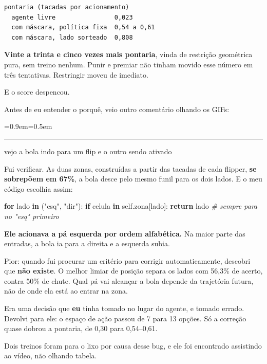 \documentclass[10pt,a4paper,twoside,twocolumn]{scrartcl}
\newenvironment{Shaded}{}{}
\newcommand{\CommentTok}[1]{\textcolor[rgb]{0.38,0.63,0.69}{\textit{#1}}}
\newcommand{\ControlFlowTok}[1]{\textcolor[rgb]{0.00,0.44,0.13}{\textbf{#1}}}
\newcommand{\KeywordTok}[1]{\textcolor[rgb]{0.00,0.44,0.13}{\textbf{#1}}}
\newcommand{\NormalTok}[1]{#1}
\newcommand{\StringTok}[1]{\textcolor[rgb]{0.25,0.44,0.63}{#1}}
\newcommand{\VariableTok}[1]{\textcolor[rgb]{0.10,0.09,0.49}{#1}}
\renewenvironment{quote}
  {\begin{list}{}{\leftmargin=0.9em\rightmargin=0pt\topsep=0.5em}\item[]%
   \color{destaque}\itshape\small
   \hspace*{-0.9em}\rule[-0.4em]{1.2pt}{1.1em}\hspace{0.5em}\ignorespaces}
  {\end{list}}
\begin{document}
\begin{verbatim}
pontaria (tacadas por acionamento)
  agente livre                0,023
  com máscara, política fixa  0,54 a 0,61
  com máscara, lado sorteado  0,808
\end{verbatim}

\textbf{Vinte a trinta e cinco vezes mais pontaria}, vinda de restrição
geométrica pura, sem treino nenhum. Punir e premiar não tinham movido
esse número em três tentativas. Restringir moveu de imediato.

E o score despencou.

Antes de eu entender o porquê, veio outro comentário olhando os GIFs:

\begin{quote}
vejo a bola indo para um flip e o outro sendo ativado
\end{quote}

Fui verificar. As duas zonas, construídas a partir das tacadas de cada
flipper, \textbf{se sobrepõem em 67\%}, a bola desce pelo mesmo funil
para os dois lados. E o meu código escolhia assim:

\begin{Shaded}
\begin{Highlighting}[]
\ControlFlowTok{for}\NormalTok{ lado }\KeywordTok{in}\NormalTok{ (}\StringTok{"esq"}\NormalTok{, }\StringTok{"dir"}\NormalTok{):}
    \ControlFlowTok{if}\NormalTok{ celula }\KeywordTok{in} \VariableTok{self}\NormalTok{.zona[lado]:}
        \ControlFlowTok{return}\NormalTok{ lado          }\CommentTok{\# sempre para no "esq" primeiro}
\end{Highlighting}
\end{Shaded}

\textbf{Ele acionava a pá esquerda por ordem alfabética.} Na maior parte
das entradas, a bola ia para a direita e a esquerda subia.

Pior: quando fui procurar um critério para corrigir automaticamente,
descobri que \textbf{não existe}. O melhor limiar de posição separa os
lados com 56,3\% de acerto, contra 50\% de chute. Qual pá vai alcançar a
bola depende da trajetória futura, não de onde ela está ao entrar na
zona.

Era uma decisão que \textbf{eu} tinha tomado no lugar do agente, e
tomado errado. Devolvi para ele: o espaço de ação passou de 7 para 13
opções. Só a correção quase dobrou a pontaria, de 0,30 para 0,54--0,61.

Dois treinos foram para o lixo por causa desse bug, e ele foi encontrado
assistindo ao vídeo, não olhando tabela.
\end{document}
